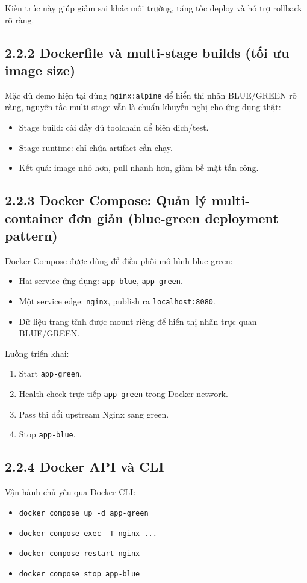 Kiến trúc này giúp giảm sai khác môi trường, tăng tốc deploy và hỗ trợ rollback rõ ràng.

\subsection*{2.2.2 Dockerfile và multi-stage builds (tối ưu image size)}
Mặc dù demo hiện tại dùng \texttt{nginx:alpine} để hiển thị nhãn BLUE/GREEN rõ ràng, nguyên tắc multi-stage vẫn là chuẩn khuyến nghị cho ứng dụng thật:
\begin{itemize}
  \item Stage build: cài đầy đủ toolchain để biên dịch/test.
  \item Stage runtime: chỉ chứa artifact cần chạy.
  \item Kết quả: image nhỏ hơn, pull nhanh hơn, giảm bề mặt tấn công.
\end{itemize}

\subsection*{2.2.3 Docker Compose: Quản lý multi-container đơn giản (blue-green deployment pattern)}
Docker Compose được dùng để điều phối mô hình blue-green:
\begin{itemize}
  \item Hai service ứng dụng: \texttt{app-blue}, \texttt{app-green}.
  \item Một service edge: \texttt{nginx}, publish ra \texttt{localhost:8080}.
  \item Dữ liệu trang tĩnh được mount riêng để hiển thị nhãn trực quan BLUE/GREEN.
\end{itemize}

Luồng triển khai:
\begin{enumerate}
  \item Start \texttt{app-green}.
  \item Health-check trực tiếp \texttt{app-green} trong Docker network.
  \item Pass thì đổi upstream Nginx sang green.
  \item Stop \texttt{app-blue}.
\end{enumerate}

\subsection*{2.2.4 Docker API và CLI}
Vận hành chủ yếu qua Docker CLI:
\begin{itemize}
  \item \texttt{docker compose up -d app-green}
  \item \texttt{docker compose exec -T nginx ...}
  \item \texttt{docker compose restart nginx}
  \item \texttt{docker compose stop app-blue}
\end{itemize}

